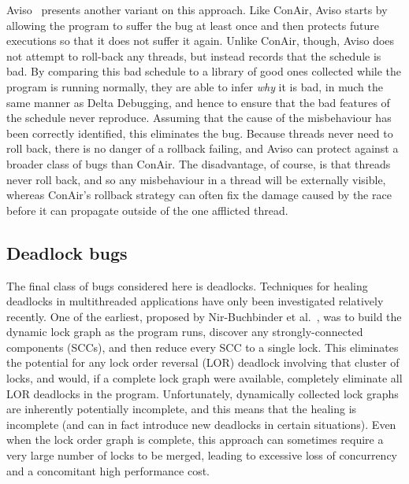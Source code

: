 Aviso~\cite{Lucia2013} presents another variant on this approach.
Like ConAir, Aviso starts by allowing the program to suffer the bug at
least once and then protects future executions so that it does not
suffer it again.  Unlike ConAir, though, Aviso does not attempt to
roll-back any threads, but instead records that the schedule is bad.
By comparing this bad schedule to a library of good ones collected
while the program is running normally, they are able to infer
\emph{why} it is bad, in much the same manner as Delta Debugging, and
hence to ensure that the bad features of the schedule never reproduce.
Assuming that the cause of the misbehaviour has been correctly
identified, this eliminates the bug.  Because threads never need to
roll back, there is no danger of a rollback failing, and Aviso can
protect against a broader class of bugs than ConAir.  The
disadvantage, of course, is that threads never roll back, and so any
misbehaviour in a thread will be externally visible, whereas ConAir's
rollback strategy can often fix the damage caused by the race before
it can propagate outside of the one afflicted thread.

\subsection{Deadlock bugs}
The final class of bugs considered here is deadlocks.  Techniques for
healing deadlocks in multithreaded applications have only been
investigated relatively recently.  One of the
earliest, proposed by Nir-Buchbinder et al.~\cite{Nir-Buchbinder2008},
was to build the dynamic lock graph as the program runs, discover any
strongly-connected components (SCCs), and then reduce every SCC to a
single lock.  This eliminates the potential for any lock order
reversal (LOR) deadlock involving that cluster of locks, and would, if
a complete lock graph were available, completely eliminate all LOR
deadlocks in the program.  Unfortunately, dynamically collected lock
graphs are inherently potentially incomplete, and this means that the
healing is incomplete (and can in fact introduce new deadlocks in
certain situations).  Even when the lock order graph is complete, this
approach can sometimes require a very large number of locks to be
merged, leading to excessive loss of concurrency and a concomitant
high performance cost.

